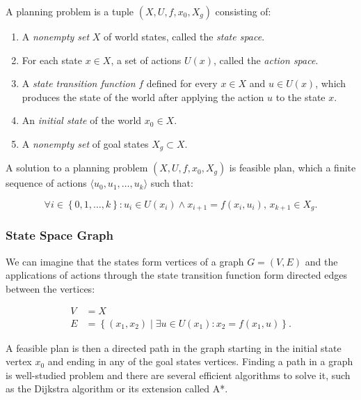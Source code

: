 \begin{defn}
	\label{def:basic_planning_problem}
	A planning problem is a tuple $\left(X, U, f, x_0, X_g\right)$ consisting of:
	
	\begin{enumerate}
		\item A \textit{nonempty set} $X$ of world states, called the \textit{state space}.
		\item For each state $x\in X$, a set of actions $U(x)$, called the \textit{action space}.
		\item A \textit{state transition function} $f$ defined for every $x\in X$ and $u\in U(x)$, which produces the state of the world after applying the action $u$ to the state $x$.
		\item An \textit{initial state} of the world $x_0\in X$.
		\item A \textit{nonempty set} of goal states $X_g\subset X$.
	\end{enumerate}
\end{defn}

\begin{defn}
	A solution to a planning problem $\left(X, U, f, x_0, X_g\right)$ is feasible plan, which a finite sequence of actions $\langle u_0, u_1, \ldots, u_k\rangle$ such that:
	
	\[
		\forall i \in \left\{0,1,\ldots,k\right\}: u_i\in U(x_i) \wedge x_{i+1}=f(x_i, u_i)\text{, } x_{k+1}\in X_g.
	\]
\end{defn}

\subsubsection{State Space Graph}

We can imagine that the states form vertices of a graph $G=(V, E)$ and the applications of actions through the state transition function form directed edges between the vertices:

\begin{equation*}
\begin{aligned}
	V&=X \\
	E&=\left\{(x_1, x_2) \mid \exists u \in U(x_1): x_2 = f(x_1, u) \right\}.
\end{aligned}
\end{equation*}

A feasible plan is then a directed path in the graph starting in the initial state vertex $x_0$ and ending in any of the goal states vertices. Finding a path in a graph is well-studied problem and there are several efficient algorithms to solve it, such as the Dijkstra algorithm or its extension called A*.

